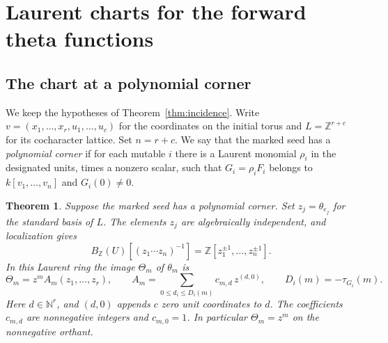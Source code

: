 \documentclass[11pt,reqno]{amsart}
\numberwithin{equation}{section}
\newtheorem{theorem}{Theorem}[section]
\theoremstyle{definition}
\theoremstyle{remark}
\begin{document}
\section{Laurent charts for the forward theta functions}
\label{sec:polynomial-corner}

\subsection{The chart at a polynomial corner}

We keep the hypotheses of Theorem~\ref{thm:incidence}. Write
\(v=(x_1,\ldots,x_r,u_1,\ldots,u_c)\) for the coordinates on the
initial torus and \(L=\mathbb Z^{r+c}\) for its cocharacter lattice.
Set \(n=r+c\). We say that the marked seed has a \emph{polynomial
corner} if for each mutable \(i\) there is a Laurent monomial
\(\rho_i\) in the designated units, times a nonzero scalar, such that
\(G_i=\rho_iF_i\) belongs to \(k[v_1,\ldots,v_n]\) and \(G_i(0)\ne0\).

\begin{theorem}\label{thm:corner}
Suppose the marked seed has a polynomial corner.
Set \(z_j=\theta_{e_j}\) for the standard basis of \(L\).
The elements \(z_j\) are algebraically independent, and localization gives
\[ B_{\mathbb Z}(U)[(z_1\cdots z_n)^{-1}]=\mathbb Z[z_1^{\pm1},\ldots,z_n^{\pm1}]. \]
In this Laurent ring the image \(\Theta_m\) of \(\theta_m\) is
\[ \Theta_m=z^m A_m(z_1,\ldots,z_r),\qquad A_m=\sum_{0\le d_i\le D_i(m)} c_{m,d}\,z^{(d,0)},\qquad D_i(m)=-\tau_{G_i}(m). \]
Here \(d\in\mathbb N^r\), and \((d,0)\) appends \(c\) zero unit
coordinates to \(d\). The coefficients \(c_{m,d}\) are nonnegative integers and \(c_{m,0}=1\).
In particular \(\Theta_m=z^m\) on the nonnegative orthant.
\end{theorem}
\end{document}
